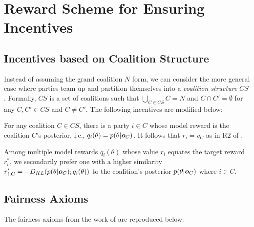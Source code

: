 \documentclass{article}
\theoremstyle{plain}
\theoremstyle{definition}
\theoremstyle{remark}
\renewcommand{\citet}[1]{\cite{#1}}
\begin{document}
\section{Reward Scheme for Ensuring Incentives}

\subsection{Incentives based on Coalition Structure}\label{app:coalition-sturcture}

Instead of assuming the grand coalition $N$ form, we can consider the more general case where parties team up and partition themselves into a \emph{coalition structure} $CS$. Formally, $CS$ is a set of coalitions such that $\bigcup_{C \in CS} C = N$ and $C \cap C' = \emptyset$ for any $C, C' \in CS$ and $C \neq C'$.
The following incentives are modified below:
\begin{description}[leftmargin=0pt]
\item[P2] For any coalition $C \in CS$, there is a party $i \in C$ whose model reward is the coalition $C$'s posterior, i.e., $q_i(\theta) = p({\theta |{\bm{o}}_C})$. It follows that $r_i = v_C$ as in R2 of \cite{simcollaborative}. 
\item[P5] Among multiple model rewards $q_i(\theta)$ whose value $r_i$ equates the target reward $r^*_i$, we secondarily prefer one with a higher similarity $r'_{i,C} = -D_{KL}(p(\theta |{\bm{o}}_C);q_i(\theta))$ to the coalition's posterior $p(\theta |{\bm{o}}_C)$ where $i \in C$.
\end{description}


\subsection{Fairness Axioms}\label{app:fair}

The fairness axioms from the work of \citet{simcollaborative} are reproduced below:
\end{document}
